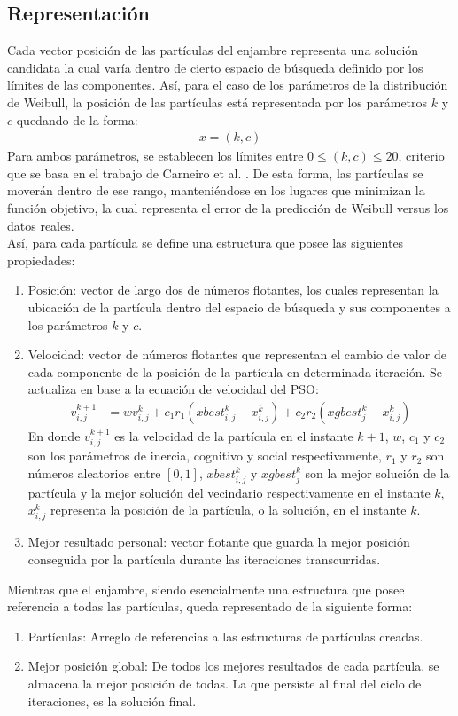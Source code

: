 \subsection{Representación}
Cada vector posición de las partículas del enjambre representa una solución candidata la cual varía dentro de cierto espacio de búsqueda definido por los límites de las componentes. Así, para el caso de los parámetros de la distribución de Weibull, la posición de las partículas está representada por los parámetros $k$ y $c$ quedando de la forma:
\begin{align}
    x = (k, c)
\end{align}    
Para ambos parámetros, se establecen los límites entre $0 \leq (k,c) \leq 20$, criterio que se basa en el trabajo de Carneiro et al. \cite{Carneiro15}. De esta forma, las partículas se moverán dentro de ese rango, manteniéndose en los lugares que minimizan la función objetivo, la cual representa el error de la predicción de Weibull versus los datos reales.\\
Así, para cada partícula se define una estructura que posee las siguientes propiedades: 
\begin{enumerate}\label{rep:Particle}
    \item Posición: vector de largo dos de números flotantes, los cuales representan la ubicación de la partícula dentro del espacio de búsqueda y sus componentes a los parámetros $k$ y $c$.
    \item Velocidad: vector de números flotantes que representan el cambio de valor de cada componente de la posición de la partícula en determinada iteración. Se actualiza en base a la ecuación de velocidad del PSO:
    \begin{align}\label{eq:PSO}
      v_{i,j}^{k+1} &= wv_{i,j}^{k} + c_{1}r_{1}(xbest_{i,j}^k - x_{i,j}^k) + c_{2}r_{2}(xgbest_{j}^{k} - x_{i,j}^k)
    \end{align} 
    En donde $v_{i,j}^{k+1}$ es la velocidad de la partícula en el instante $k+1$, $w$, $c_1$ y $c_2$ son los parámetros de inercia, cognitivo y social respectivamente, $r_{1}$ y $r_{2}$ son números aleatorios entre $[0, 1]$, $xbest_{i,j}^k$ y $xgbest_{j}^{k}$ son la mejor solución de la partícula y la mejor solución del vecindario respectivamente en el instante $k$, $x_{i,j}^k$ representa la posición de la partícula, o la solución, en el instante $k$.    
    \item Mejor resultado personal: vector flotante que guarda la mejor posición conseguida por la partícula durante las iteraciones transcurridas.    
\end{enumerate}        
Mientras que el enjambre, siendo esencialmente una estructura que posee referencia a todas las partículas, queda representado de la siguiente forma:
\begin{enumerate}\label{rep:Swarm}
    \item Partículas: Arreglo de referencias a las estructuras de partículas creadas.
    \item Mejor posición global: De todos los mejores resultados de cada partícula, se almacena la mejor posición de todas. La que persiste al final del ciclo de iteraciones, es la solución final.
\end{enumerate} 

